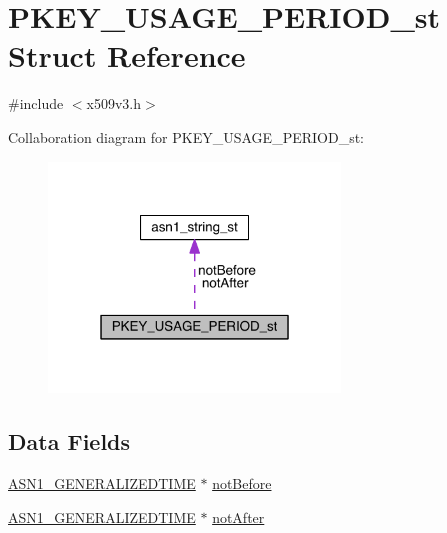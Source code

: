 \hypertarget{struct_p_k_e_y___u_s_a_g_e___p_e_r_i_o_d__st}{}\section{P\+K\+E\+Y\+\_\+\+U\+S\+A\+G\+E\+\_\+\+P\+E\+R\+I\+O\+D\+\_\+st Struct Reference}
\label{struct_p_k_e_y___u_s_a_g_e___p_e_r_i_o_d__st}


{\ttfamily \#include $<$x509v3.\+h$>$}



Collaboration diagram for P\+K\+E\+Y\+\_\+\+U\+S\+A\+G\+E\+\_\+\+P\+E\+R\+I\+O\+D\+\_\+st\+:\nopagebreak
\begin{figure}[H]
\begin{center}
\leavevmode
\includegraphics[width=220pt]{struct_p_k_e_y___u_s_a_g_e___p_e_r_i_o_d__st__coll__graph}
\end{center}
\end{figure}
\subsection*{Data Fields}
\begin{DoxyCompactItemize}
\item 
\hyperlink{crypto_2ossl__typ_8h_abd19ea5b527807ce3a516e6a41440f84}{A\+S\+N1\+\_\+\+G\+E\+N\+E\+R\+A\+L\+I\+Z\+E\+D\+T\+I\+ME} $\ast$ \hyperlink{struct_p_k_e_y___u_s_a_g_e___p_e_r_i_o_d__st_a1f4540963c9c687c144bd3125d351f50}{not\+Before}
\item 
\hyperlink{crypto_2ossl__typ_8h_abd19ea5b527807ce3a516e6a41440f84}{A\+S\+N1\+\_\+\+G\+E\+N\+E\+R\+A\+L\+I\+Z\+E\+D\+T\+I\+ME} $\ast$ \hyperlink{struct_p_k_e_y___u_s_a_g_e___p_e_r_i_o_d__st_a2edd51bc270d6c8a89d3f455d91b90a8}{not\+After}
\end{DoxyCompactItemize}


